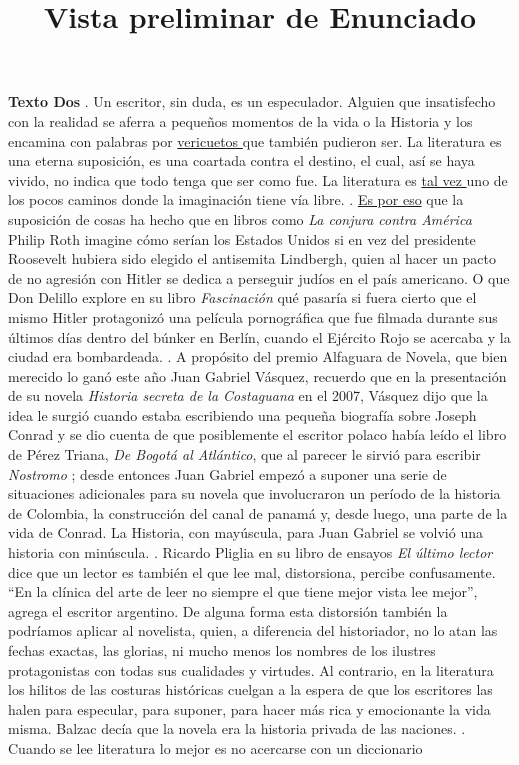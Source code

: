 \documentclass[a4paper,10pt]{article}\usepackage[utf8]{inputenc}\usepackage[spanish]{babel}\usepackage{times}
\title{Vista preliminar de Enunciado}
\begin{document}
\twocolumn 

\maketitle

\textbf{ Texto Dos } . Un escritor, sin duda, es un especulador. Alguien que insatisfecho con la realidad se aferra a pequeños momentos de la vida o la Historia y los encamina con palabras por \underline{ vericuetos } que también pudieron ser. La literatura es una eterna suposición, es una coartada contra el destino, el cual, así se haya vivido, no indica que todo tenga que ser como fue. La literatura es \underline{ tal vez } uno de los pocos caminos donde la imaginación tiene vía libre. . \underline{ Es por eso} que la suposición de cosas ha hecho que en libros como \textit{ La conjura contra América } Philip Roth imagine cómo serían los Estados Unidos si en vez del presidente Roosevelt hubiera sido elegido el antisemita Lindbergh, quien al hacer un pacto de no agresión con Hitler se dedica a perseguir judíos en el país americano. O que Don Delillo explore en su libro \textit{ Fascinación} qué pasaría si fuera cierto que el mismo Hitler protagonizó una película pornográfica que fue filmada durante sus últimos días dentro del búnker en Berlín, cuando el Ejército Rojo se acercaba y la ciudad era bombardeada. . A propósito del premio Alfaguara de Novela, que bien merecido lo ganó este año Juan Gabriel Vásquez, recuerdo que en la presentación de su novela  \textit{ Historia secreta de la Costaguana } en el 2007, Vásquez dijo que la idea le surgió cuando estaba escribiendo una pequeña biografía sobre Joseph Conrad y se dio cuenta de que posiblemente el escritor polaco había leído el libro de Pérez Triana, \textit{De Bogotá al Atlántico}, que al parecer le sirvió para escribir  \textit{ Nostromo }; desde entonces Juan Gabriel empezó a suponer una serie de situaciones adicionales para su novela que involucraron un período de la historia de Colombia, la construcción del canal de panamá y, desde luego, una parte de la vida de Conrad. La Historia, con mayúscula, para Juan Gabriel se volvió una historia con minúscula. . Ricardo Pliglia en su libro de ensayos \textit{ El último lector} dice que un lector es también el que lee mal, distorsiona, percibe confusamente. “En la clínica del arte de leer no siempre el que tiene mejor vista lee mejor”, agrega el escritor argentino. De alguna forma esta distorsión también la podríamos aplicar al novelista, quien, a diferencia del historiador, no lo atan las fechas exactas, las glorias, ni mucho menos los nombres de los ilustres protagonistas con todas sus cualidades y virtudes. Al contrario, en la literatura los hilitos de las costuras históricas cuelgan a la espera de que los escritores las halen para especular, para suponer, para hacer más rica y emocionante la vida misma. Balzac decía que la novela era la historia privada de las naciones. . Cuando se lee literatura lo mejor es no acercarse con un diccionario 
\end{document}
